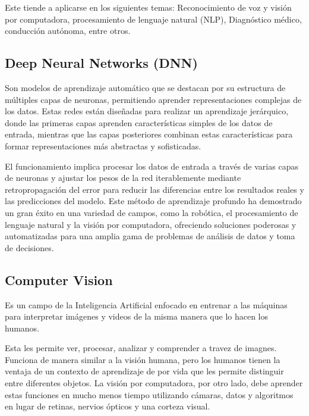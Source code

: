 Este tiende a aplicarse en los siguientes temas: Reconocimiento de voz y visión por computadora, procesamiento de lenguaje natural (NLP), Diagnóstico médico, conducción autónoma, entre otros.


\subsection{Deep Neural Networks (DNN)}
Son modelos de aprendizaje automático que se destacan por su estructura de múltiples capas de neuronas, permitiendo aprender representaciones complejas de los datos. Estas redes están diseñadas para realizar un aprendizaje jerárquico, donde las primeras capas aprenden características simples de los datos de entrada, mientras que las capas posteriores combinan estas características para formar representaciones más abstractas y sofisticadas.

El funcionamiento implica procesar los datos de entrada a través de varias capas de neuronas y ajustar los pesos de la red iterablemente mediante retropropagación del error para reducir las diferencias entre los resultados reales y las predicciones del modelo. Este método de aprendizaje profundo ha demostrado un gran éxito en una variedad de campos, como la robótica, el procesamiento de lenguaje natural y la visión por computadora, ofreciendo soluciones poderosas y automatizadas para una amplia gama de problemas de análisis de datos y toma de decisiones.









\subsection{Computer Vision}
Es un campo de la Inteligencia Artificial enfocado en entrenar a las máquinas para interpretar imágenes y videos de la misma manera que lo hacen los humanos.

Esta les permite ver, procesar, analizar y comprender a travez de imagnes. Funciona de manera similar a la visión humana, pero los humanos tienen la ventaja de un contexto de aprendizaje de por vida que les permite distinguir entre diferentes objetos. La visión por computadora, por otro lado, debe aprender estas funciones en mucho menos tiempo utilizando cámaras, datos y algoritmos en lugar de retinas, nervios ópticos y una corteza visual.

